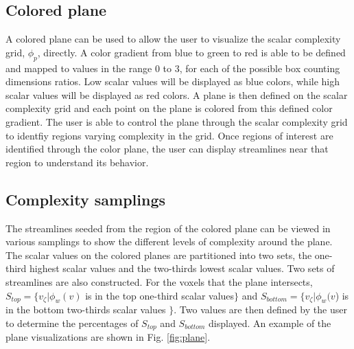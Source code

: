 \documentclass{egpubl}
\begin{document}
\subsection{Colored plane}
A colored plane can be used to allow the user to visualize the scalar complexity grid, $\phi_p$, directly.
A color gradient from blue to green to red is able to be defined and mapped to values in the range 0 to 3, for each of the possible box counting dimensions ratios.
Low scalar values will be displayed as blue colors, while high scalar values will be displayed as red colors.
A plane is then defined on the scalar complexity grid and each point on the plane is colored from this defined color gradient.
The user is able to control the plane through the scalar complexity grid to identfiy regions varying complexity in the grid.
Once regions of interest are identified through the color plane, the user can display streamlines near that region to understand its behavior.

\subsection{Complexity samplings}
The streamlines seeded from the region of the colored plane can be viewed in various samplings to show the different levels of complexity around the plane.
The scalar values on the colored planes are partitioned into two sets, the one-third highest scalar values and the two-thirds lowest scalar values.
Two sets of streamlines are also constructed.
For the voxels that the plane intersects, $S_{top} = \{ v_\zeta | \phi_w(v)$ is in the top one-third scalar values$\}$ and $S_{bottom} = \{ v_\zeta | \phi_w(v$) is in the bottom two-thirds scalar values $\}$.
Two values are then defined by the user to determine the percentages of $S_{top}$ and $S_{bottom}$ displayed.
An example of the plane visualizations are shown in Fig. \ref{fig:plane}.
\end{document}
